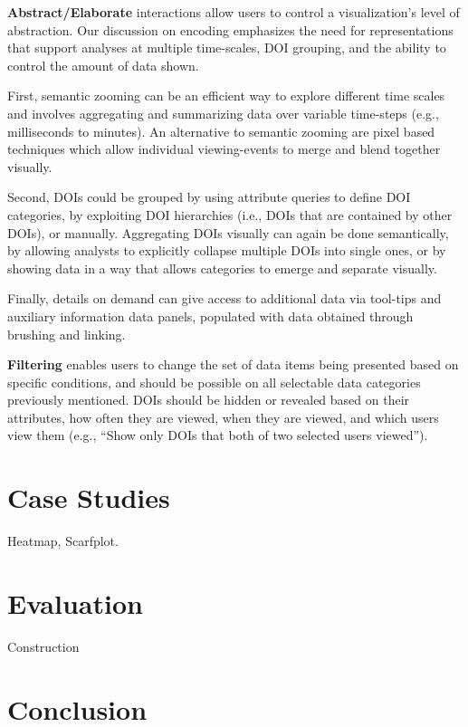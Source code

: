 \noindent \textbf{Abstract/Elaborate} interactions allow users to control a visualization's level of abstraction. Our discussion on encoding emphasizes the need for representations that support analyses at multiple time-scales, DOI grouping, and the ability to control the amount of data shown. 

First, semantic zooming can be an efficient way to explore different time scales and involves aggregating and summarizing data over variable time-steps (e.g., milliseconds to minutes). An alternative to semantic zooming are pixel based techniques which allow individual viewing-events to merge and blend together visually\cite{keim2000designing}. 

Second, DOIs could be grouped by using attribute queries to define DOI categories, by exploiting DOI hierarchies (i.e., DOIs that are contained by other DOIs), or manually. Aggregating DOIs visually can again be done semantically, by allowing analysts to explicitly collapse multiple DOIs into single ones, or by showing data in a way that allows categories to emerge and separate visually. 

 Finally, details on demand can give access to additional data via tool-tips and auxiliary information data panels, populated with data obtained through brushing and linking.
  
	
\noindent \textbf{Filtering} enables users to change the set of data items being presented based on specific conditions, and should be possible on all selectable data categories previously mentioned. DOIs should be hidden or revealed based on their attributes, how often they are viewed, when they are viewed, and which users view them (e.g., ``Show only DOIs that both of two selected users viewed'').
	
\section{Case Studies}
Heatmap, Scarfplot. 

\section{Evaluation}
Construction
\section{Conclusion}